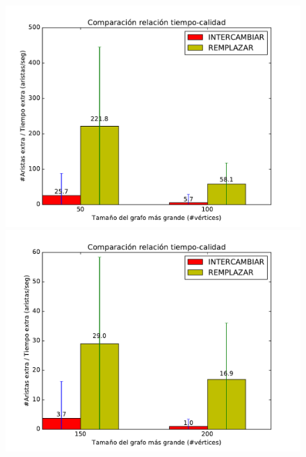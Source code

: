 \begin{figure}[H]
\centering
\begin{minipage}{0.49\textwidth}
  \centering
    \includegraphics[width=1\textwidth]{graficos/problema_6/cociente0-0.pdf}
  \caption{\footnotesize{}}
  \label{fig:calidad5-1}
\end{minipage}%
\hspace{0.01\textwidth}
\begin{minipage}{0.49\textwidth}   
  \centering
    \includegraphics[width=1\textwidth]{graficos/problema_6/cociente0-2.pdf} 
  \caption{\footnotesize{}}
  \label{fig:calidad5-2}
\end{minipage}


\end{figure}
